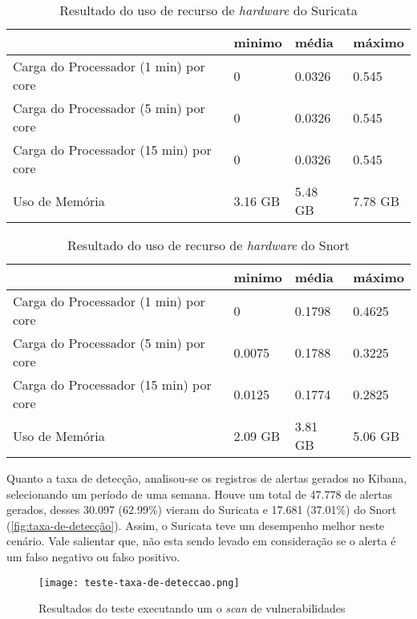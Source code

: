 \begin{table}[!htb]
\ABNTEXfontereduzida
\centering
\caption{Resultado do uso de recurso de \textit{hardware} do Suricata}
\label{tab:suricata-recursos}
\begin{tabular}{|M{5cm}|M{2cm}|M{2cm}|M{2cm}|}
    \hline
     & \textbf{minimo} & \textbf{média} & \textbf{máximo} \\
    \hline
    Carga do Processador (1 min) por core & 0 & 0.0326 & 0.545 \\
    \hline
    Carga do Processador (5 min) por core & 0 & 0.0326 & 0.545 \\
    \hline
    Carga do Processador (15 min) por core & 0 & 0.0326 & 0.545 \\
    \hline
    Uso de Memória & 3.16 GB & 5.48 GB & 7.78 GB \\
    \hline
\end{tabular}
\end{table}

\begin{table}[!htb]
\ABNTEXfontereduzida
\centering
\caption{Resultado do uso de recurso de \textit{hardware} do Snort}
\label{tab:snort-recursos}
\begin{tabular}{|M{5cm}|M{2cm}|M{2cm}|M{2cm}|}
    \hline
     & \textbf{minimo} & \textbf{média} & \textbf{máximo} \\
    \hline
    Carga do Processador (1 min) por core & 0 & 0.1798 & 0.4625 \\
    \hline
    Carga do Processador (5 min) por core & 0.0075 & 0.1788 & 0.3225 \\
    \hline
    Carga do Processador (15 min) por core & 0.0125 & 0.1774 & 0.2825 \\
    \hline
    Uso de Memória & 2.09 GB & 3.81 GB & 5.06 GB \\
    \hline
\end{tabular}
\end{table}

Quanto a taxa de detecção, analisou-se os registros de alertas gerados no Kibana, selecionando um período de uma semana. Houve um total de 47.778 de alertas gerados, desses 30.097 (62.99\%) vieram do Suricata e 17.681 (37.01\%) do Snort (\autoref{fig:taxa-de-detecção}). Assim, o Suricata teve um desempenho melhor neste cenário. Vale salientar que, não esta sendo levado em consideração se o alerta é um falso negativo ou falso positivo.

\begin{figure}[!htb]
    \centering
    \caption{Resultados do teste executando um o \textit{scan} de vulnerabilidades}
    \texttt{[image: teste-taxa-de-deteccao.png]}
    \label{fig:taxa-de-detecção}
\end{figure}

